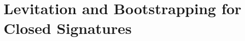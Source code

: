 \documentclass[12pt,a4paper,twoside,openany]{book}
\theoremstyle{remark}
\theoremstyle{definition}
\theoremstyle{theorem}
\newcommand{\ms}[1]{\mathsf{#1}}
\newcommand{\bs}[1]{\boldsymbol{#1}}
\newcommand{\id}{\mathsf{id}}
\newcommand{\Con}{\mathsf{Con}}
\newcommand{\Sub}{\mathsf{Sub}}
\newcommand{\Tm}{\mathsf{Tm}}
\newcommand{\Ty}{\mathsf{Ty}}
\newcommand{\U}{\mathsf{U}}
\newcommand{\El}{\mathsf{El}}
\newcommand{\blank}{\mathord{\hspace{1pt}\text{--}\hspace{1pt}}}
\newcommand{\Sig}{\mathsf{Sig}}
\newcommand{\defn}{:\equiv}
\newcommand{\lub}{\,\sqcup\,}
\newcommand{\bmsA}{\bs{\ms{A}}}
\begin{document}






\section{Levitation and Bootstrapping for Closed Signatures}
\label{sec:closed-levitation}
\end{document}
